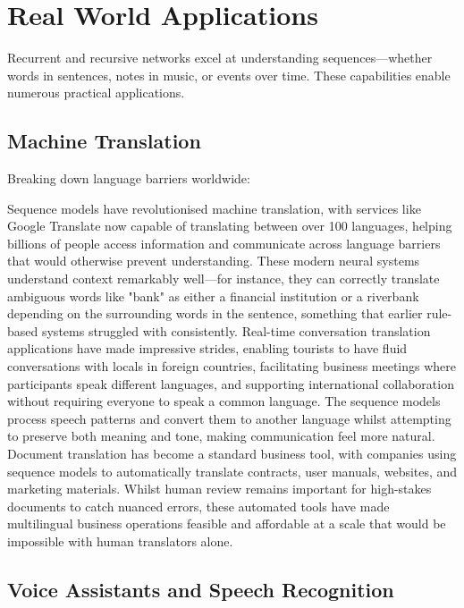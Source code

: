 
\section{Real World Applications}
\label{sec:sequence-real-world}


Recurrent and recursive networks excel at understanding sequences—whether words in sentences, notes in music, or events over time. These capabilities enable numerous practical applications.

\subsection{Machine Translation}

Breaking down language barriers worldwide:

Sequence models have revolutionised machine translation, with services like Google Translate now capable of translating between over 100 languages, helping billions of people access information and communicate across language barriers that would otherwise prevent understanding. These modern neural systems understand context remarkably well—for instance, they can correctly translate ambiguous words like "bank" as either a financial institution or a riverbank depending on the surrounding words in the sentence, something that earlier rule-based systems struggled with consistently. Real-time conversation translation applications have made impressive strides, enabling tourists to have fluid conversations with locals in foreign countries, facilitating business meetings where participants speak different languages, and supporting international collaboration without requiring everyone to speak a common language. The sequence models process speech patterns and convert them to another language whilst attempting to preserve both meaning and tone, making communication feel more natural. Document translation has become a standard business tool, with companies using sequence models to automatically translate contracts, user manuals, websites, and marketing materials. Whilst human review remains important for high-stakes documents to catch nuanced errors, these automated tools have made multilingual business operations feasible and affordable at a scale that would be impossible with human translators alone.

\subsection{Voice Assistants and Speech Recognition}

